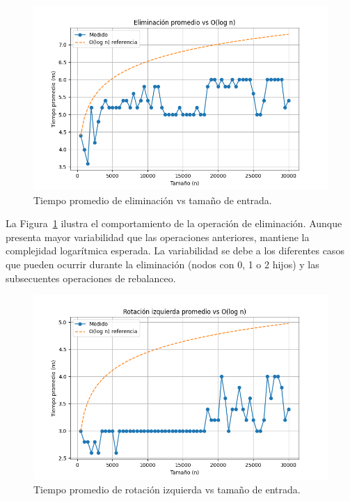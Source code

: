 \documentclass[conference]{IEEEtran}
\begin{document}
\begin{figure}[H]
    \centering
    \includegraphics[width=0.9\columnwidth]{remove.png}
    \caption{Tiempo promedio de eliminación vs tamaño de entrada.}
    \label{fig:remove_performance}
\end{figure}

La Figura~\ref{fig:remove_performance} ilustra el comportamiento de la operación de eliminación. Aunque presenta mayor variabilidad que las operaciones anteriores, mantiene la complejidad logarítmica esperada. La variabilidad se debe a los diferentes casos que pueden ocurrir durante la eliminación (nodos con 0, 1 o 2 hijos) y las subsecuentes operaciones de rebalanceo.

\begin{figure}[H]
    \centering
    \includegraphics[width=0.9\columnwidth]{left_rotate.png}
    \caption{Tiempo promedio de rotación izquierda vs tamaño de entrada.}
    \label{fig:left_rotate_performance}
\end{figure}
\end{document}
